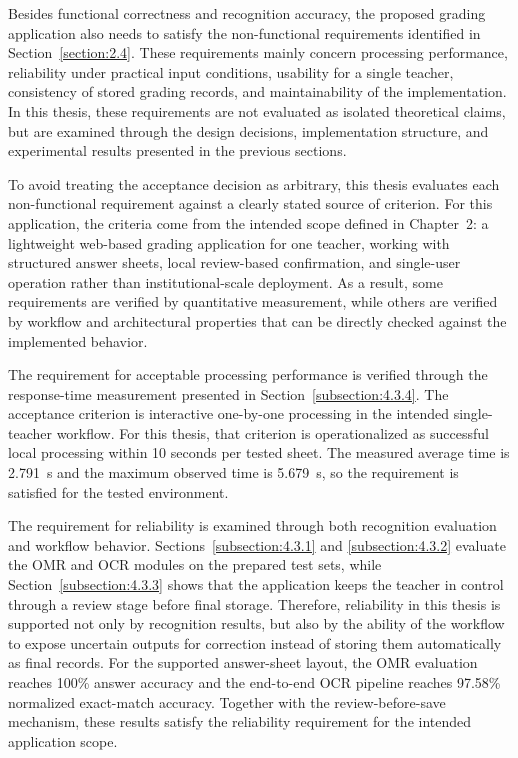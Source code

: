 \documentclass[../Main.tex]{subfiles}
\begin{document}
Besides functional correctness and recognition accuracy, the proposed grading
application also needs to satisfy the non-functional requirements identified in
Section~\ref{section:2.4}. These requirements mainly concern processing
performance, reliability under practical input conditions, usability for a
single teacher, consistency of stored grading records, and maintainability of
the implementation. In this thesis, these requirements are not evaluated as
isolated theoretical claims, but are examined through the design decisions,
implementation structure, and experimental results presented in the previous
sections.

To avoid treating the acceptance decision as arbitrary, this thesis evaluates
each non-functional requirement against a clearly stated source of criterion.
For this application, the criteria come from the intended scope defined in
Chapter~2: a lightweight web-based grading application for one teacher, working
with structured answer sheets, local review-based confirmation, and
single-user operation rather than institutional-scale deployment. As a result,
some requirements are verified by quantitative measurement, while others are
verified by workflow and architectural properties that can be directly checked
against the implemented behavior.

The requirement for acceptable processing performance is verified through the
response-time measurement presented in Section~\ref{subsection:4.3.4}. The
acceptance criterion is interactive one-by-one processing in the intended
single-teacher workflow. For this thesis, that criterion is operationalized as
successful local processing within 10 seconds per tested sheet. The measured
average time is 2.791~s and the maximum observed time is 5.679~s, so the
requirement is satisfied for the tested environment.

The requirement for reliability is examined through both recognition evaluation
and workflow behavior. Sections~\ref{subsection:4.3.1} and
\ref{subsection:4.3.2} evaluate the OMR and OCR modules on the prepared test
sets, while Section~\ref{subsection:4.3.3} shows that the application keeps the
teacher in control through a review stage before final storage. Therefore,
reliability in this thesis is supported not only by recognition results, but
also by the ability of the workflow to expose uncertain outputs for correction
instead of storing them automatically as final records. For the supported
answer-sheet layout, the OMR evaluation reaches 100\% answer accuracy and the
end-to-end OCR pipeline reaches 97.58\% normalized exact-match accuracy.
Together with the review-before-save mechanism, these results satisfy the
reliability requirement for the intended application scope.
\end{document}
